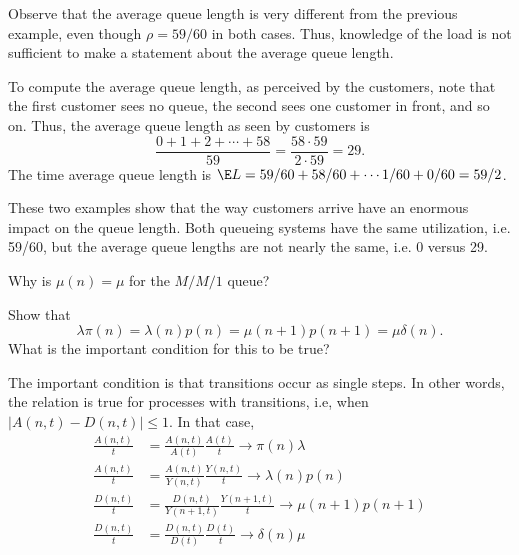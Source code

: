 \begin{question}
\begin{solution}
\begin{enumerate}
  Observe that the average queue length is very different from the
  previous example, even though $\rho = 59/60$ in both cases. Thus,
  knowledge of the load is not sufficient to make a statement about the
  average queue length.

  To compute the average queue length, as perceived by the customers,
  note that the first customer sees no queue, the second sees one
  customer in front, and so on. Thus, the average queue length as seen
  by customers is
  \begin{equation*}
   \frac{0+1+2+\cdots+58}{59}=\frac{58\cdot 59}{2\cdot 59} = 29.
  \end{equation*}
The time average queue length is $\E L = 59/60 + 58/60 + \cdots 1/60 + 0/60 = 59/2$. 
\end{enumerate}

These two examples show that the way customers arrive have an enormous
impact on the queue length. Both queueing systems have the same
utilization, i.e. 59/60, but the average queue lengths are not nearly
the same, i.e. 0 versus 29.
  \end{solution}
\end{question}

\begin{question}[use=false]
 Why is $\mu(n) = \mu$ for the $M/M/1$ queue?
 \begin{solution}
   
 \end{solution}
\end{question}


\begin{question}
Show that 
\begin{equation*}
\lambda  \pi(n) = \lambda(n) p(n) = \mu(n+1) p(n+1) = \mu \delta(n).
\end{equation*}
What is the important condition for this to be true?
\begin{solution}
  The important condition is that transitions occur as single
  steps. In other words, the relation is true for processes with
   transitions, i.e, when $|A(n,t) - D(n,t)|\leq 1$.
  In  that case, 
\begin{align*}
  \frac{A(n,t)}{t} &=   \frac{A(n,t)}{A(t)} \frac{A(t)}{t} \to \pi(n) \lambda\\
  \frac{A(n,t)}{t} &=   \frac{A(n,t)}{Y(n,t)} \frac{Y(n,t)}{t} \to \lambda(n)p(n)\\
  \frac{D(n,t)}{t} &=   \frac{D(n,t)}{Y(n+1,t)} \frac{Y(n+1,t)}{t} \to \mu(n+1)p(n+1)\\
  \frac{D(n,t)}{t} &=   \frac{D(n,t)}{D(t)} \frac{D(t)}{t} \to \delta(n)\mu\\
\end{align*}
\end{solution}
\end{question}





